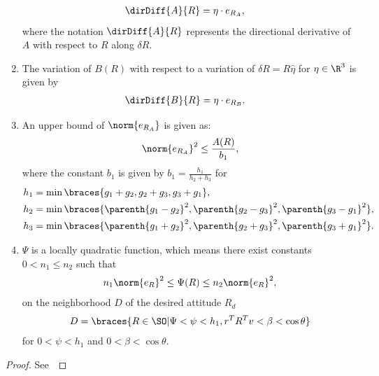 \begin{prop}
\begin{enumerate}
	\begin{align}\label{eq:dirDiff_A}
		\dirDiff{A}{R} &= \eta \cdot e_{R_A} ,
	\end{align}
	where the notation \( \dirDiff{A}{R} \) represents the directional derivative of $A$ with respect to $R$ along $\delta R$.
	\item \label{item:prop_erb} The variation of \( B(R) \) with respect to a variation of \( \delta R = R \hat{\eta} \) for \( \eta \in \R^3 \) is given by
	\begin{align}\label{eq:dirDiff_B}
		\dirDiff{B}{R} &= \eta \cdot e_{R_{B}}.
	\end{align}
	\item \label{item:prop_era_upbound}An upper bound of \( \norm{e_{R_A}} \) is given as:
	\begin{align}
		\norm{e_{R_A}}^2 \leq \frac{A(R)}{b_1} , \label{eqn:psi_lower_bound}
	\end{align}
	where the constant \( b_1 \) is given by \( b_1 = \frac{h_1}{h_2 + h_3} \) for 
	\begin{align*}
		h_1 &= \min\braces{g_1 + g_2, g_2 + g_3 , g_3 + g_1} ,\\
		h_2 &= \min\braces{\parenth{g_1 -g_2}^2,\parenth{g_2 -g_3}^2 , \parenth{g_3 -g_1}^2} ,\\
		h_3 &= \min\braces{\parenth{g_1 + g_2}^2, \parenth{g_2 + g_3}^2 , \parenth{g_3 + g_1}^2}.		
	\end{align*}
    \item \label{item:prop_psi_quadratic} \( \Psi \) is a locally quadratic function, which means there exist constants \( 0 < n_1 \leq n_2 \) such that
    \begin{align}\label{eq:psi_bound}
        n_1 \norm{e_R}^2 \leq \Psi(R) \leq n_2 \norm{e_R}^2 ,
    \end{align}
    on the neighborhood $D$ of the desired attitude \( R_d \)
    \begin{align}\label{eq:psi_quadratic_domain}
        D = \braces{R\in\SO  \vert \Psi < \psi < h_1, r^T R^T v < \beta < \cos \theta}
    \end{align}
    for $0<\psi < h_1 $ and $0< \beta<\cos\theta$. 
\end{enumerate}
\end{prop}
\begin{proof}
See~
\end{proof}

